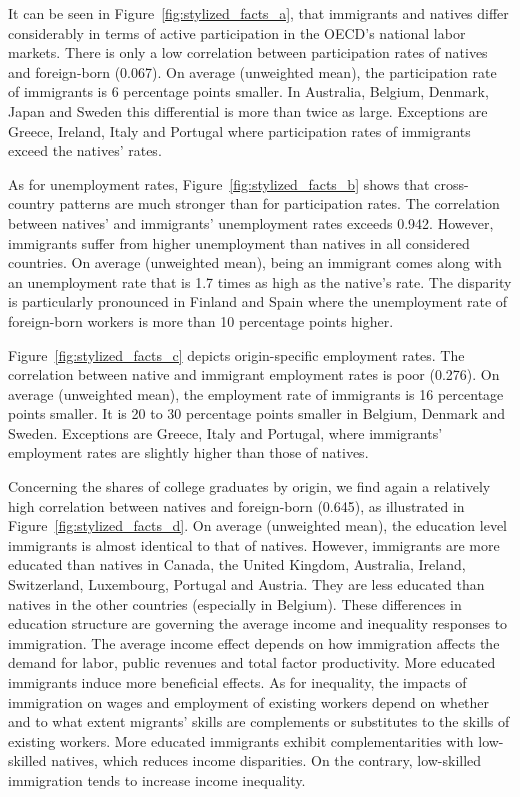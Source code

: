 \documentclass[a4paper,12pt]{article}
\begin{document}
It can be seen in Figure~\ref{fig:stylized_facts_a}, that immigrants and natives differ considerably in terms of active participation in the OECD's national labor markets. There is only a low correlation between participation rates of natives and foreign-born (0.067). On average (unweighted mean), the participation rate of immigrants is 6 percentage points smaller. In Australia, Belgium, Denmark, Japan and Sweden this differential is more than twice as large. Exceptions are Greece, Ireland, Italy and Portugal where participation rates of immigrants exceed the natives' rates.

As for unemployment rates, Figure~\ref{fig:stylized_facts_b} shows that cross-country patterns are much stronger than for participation rates. The correlation between natives' and immigrants' unemployment rates exceeds 0.942. However, immigrants suffer from higher unemployment than natives in all considered countries. On average (unweighted mean), being an immigrant comes along with an unemployment rate that is 1.7 times as high as the native's rate. The disparity is particularly pronounced in Finland and Spain where the unemployment rate of foreign-born workers is more than 10 percentage points higher. 

Figure~\ref{fig:stylized_facts_c} depicts origin-specific employment rates. The correlation between native and immigrant employment rates is poor (0.276). On average (unweighted mean), the employment rate of immigrants is 16 percentage points smaller. It is 20 to 30 percentage points smaller in Belgium, Denmark and Sweden. Exceptions are Greece, Italy and Portugal, where immigrants' employment rates are slightly higher than those of natives.

Concerning the shares of college graduates by origin, we find again a relatively high correlation between natives and foreign-born (0.645), as illustrated in Figure~\ref{fig:stylized_facts_d}. On average (unweighted mean), the education level immigrants is almost identical to that of natives. However, immigrants are more educated than natives in Canada, the United Kingdom, Australia, Ireland, Switzerland, Luxembourg, Portugal and Austria. They are less educated than natives in the other countries (especially in Belgium). These differences in education structure are governing the average income and inequality responses to immigration. The average income effect depends on how immigration affects the demand for labor, public revenues and total factor productivity. More educated immigrants induce more beneficial effects. As for inequality, the impacts of immigration on wages and employment of existing workers depend on whether and to what extent migrants’ skills are complements or substitutes to the skills of existing workers. More educated immigrants exhibit complementarities with low-skilled natives, which reduces income disparities. On the contrary, low-skilled immigration tends to increase income inequality.
\end{document}
